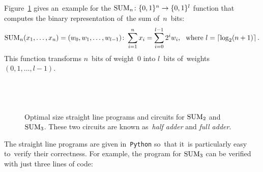 Figure~\ref{figure:sum23} gives an~example for
the
$\operatorname{SUM}_n \colon \{0,1\}^n \to \{0,1\}^l$ function
that computes the binary representation of~the sum of~$n$~bits:
\[\operatorname{SUM}_n(x_1, \dotsc, x_n)=(w_0, w_1, \dotsc, w_{l-1})\colon \sum_{i=1}^{n}x_i=\sum_{i=0}^{l-1}2^iw_i \text{, \, where } l=\lceil \log_2(n+1)\rceil \, .\]
This function transforms $n$~bits
of weight~0 into $l$~bits
of~weights $(0,1,\dotsc,l-1)$.
%
\begin{figure}[!ht]
\begin{minipage}{.28\textwidth}
\inputminted[firstline=15,lastline=18]{python}{../tutorial.py}
\end{minipage}
\begin{minipage}{.18\textwidth}
\end{minipage}
\begin{minipage}{.33\textwidth}
\inputminted[firstline=22,lastline=28]{python}{../tutorial.py}
\end{minipage}
\begin{minipage}{.18\textwidth}
~
\end{minipage}
\caption{Optimal size straight line programs and circuits for $\operatorname{SUM}_2$ and $\operatorname{SUM}_3$. These two circuits are known as~\emph{half adder} and \emph{full adder}.}
\label{figure:sum23}
\end{figure}
%
The straight line
programs are given
in~\texttt{Python}
so~that
it~is particularly easy to~verify their correctness.
For example, the program for $\operatorname{SUM}_3$ can be verified
with just three lines of code:
\inputminted[firstline=32,lastline=36]{python}{../tutorial.py}

